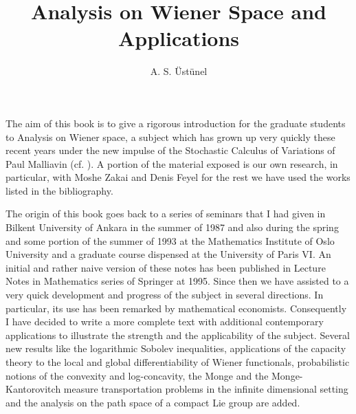 \documentclass[12pt,a4paper]{book}
\begin{document}
\pagestyle{myheadings}

\thispagestyle{empty}
\begin{titlepage}
\title{\bf\Huge  Analysis on Wiener Space and Applications}
\author{A. S. \"Ust\"unel}
\date{}
\end{titlepage}

\maketitle

\newpage
{}




 The aim of this book is  to give a   rigorous introduction for the
 graduate students  to  Analysis  on  Wiener space, a subject which
 has grown up very quickly these recent 
years under the new  impulse of the Stochastic Calculus of Variations of Paul
Malliavin (cf. \cite{Mall}). A  portion  of the  material exposed
is our own research, in particular, with Moshe Zakai and Denis
Feyel for the rest we have used  the works listed  in  the  bibliography.

The origin of this  book goes back to a series of  seminars  that I
had given in Bilkent University of Ankara  in the summer of 1987 and
also  during the spring and some portion  of the summer of 1993 at 
the Mathematics Institute of Oslo University and a graduate course
dispensed at the University of Paris VI.  An initial and rather naive  version of
these notes  has  been published in Lecture Notes in Mathematics
series of Springer at 1995. Since then we have assisted to  a very quick development
and progress of  the subject  in several directions. In particular,
its use has been remarked by mathematical economists. Consequently I
have decided to write a more complete text with additional
contemporary  applications to illustrate the  strength and the
applicability of the subject. Several new results like  the logarithmic
Sobolev inequalities, applications of the capacity theory to the
local and global differentiability of Wiener functionals,
probabilistic notions of the convexity and log-concavity, the Monge
and the 
Monge-Kantorovitch measure transportation problems in the infinite
dimensional setting  and the analysis on the path space of a compact Lie group are added.
\end{document}
